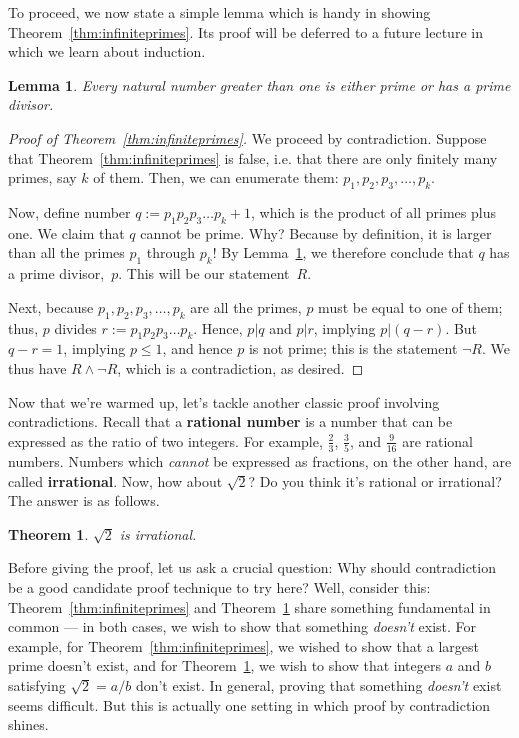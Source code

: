 \documentclass[11pt]{article}
\newcounter{thm}
\newtheorem{theorem}{Theorem}[thm]
\newtheorem{lemma}{Lemma}[thm]
\begin{document}
To proceed, we now state a simple lemma which is handy in showing Theorem~\ref{thm:infiniteprimes}. Its proof will be deferred to a future lecture in which we learn about induction.

\begin{lemma}\label{lem:prime}
    Every natural number greater than one is either prime or has a prime divisor.
\end{lemma}
\begin{proof}[Proof of Theorem~\ref{thm:infiniteprimes}]
    We proceed by contradiction. Suppose that Theorem~\ref{thm:infiniteprimes} is false, i.e. that there are only finitely many primes, say $k$ of them. Then, we can enumerate them: $p_1, p_2, p_3, \ldots, p_k$.

    Now, define number $q:=p_1 p_2 p_3 \ldots p_k + 1$, which is the product of all primes plus one. We claim that $q$ cannot be prime. Why? Because by definition, it is larger than all the primes $p_1$ through $p_k$! By Lemma~\ref{lem:prime}, we therefore conclude that $q$ has a prime divisor,~$p$. This will be our statement~$R$.

    Next, because $p_1, p_2, p_3, \ldots, p_k$ are all the primes, $p$ must be equal to one of them; thus, $p$ divides $r:=p_1 p_2 p_3 \ldots p_k$. Hence, $p|q$ and $p|r$, implying $p|(q-r)$. But $q-r=1$, implying $p\leq 1$, and hence $p$ is not prime; this is the statement $\neg R$. We thus have $R\wedge \neg R$, which is a contradiction, as desired.
\end{proof}

Now that we're warmed up, let's tackle another classic proof involving contradictions. Recall that a \textbf{rational number} is a number that can be expressed as the
ratio of two integers. For example, $\frac{2}{3}$, $\frac{3}{5}$, and $\frac{9}{16}$ are
rational numbers. Numbers which \emph{cannot} be expressed as fractions, on the other hand, are called \textbf{irrational}. Now, how about $\sqrt{2}$? Do you think it's rational or irrational? The answer is as follows.

\begin{theorem}\label{thm:irrational}
    $\sqrt{2}$ is irrational.
\end{theorem}

Before giving the proof, let us ask a crucial question: Why should contradiction be a good candidate proof technique to try here? Well, consider this: Theorem~\ref{thm:infiniteprimes} and Theorem~\ref{thm:irrational} share something fundamental in common --- in both cases, we wish to show that something \emph{doesn't} exist. For example, for Theorem~\ref{thm:infiniteprimes}, we wished to show that a largest prime doesn't exist, and for Theorem~\ref{thm:irrational}, we wish to show that integers $a$ and $b$ satisfying $\sqrt{2}=a/b$ don't exist. In general, proving that something \emph{doesn't} exist seems difficult. But this is actually one setting in which proof by contradiction shines.
\end{document}
